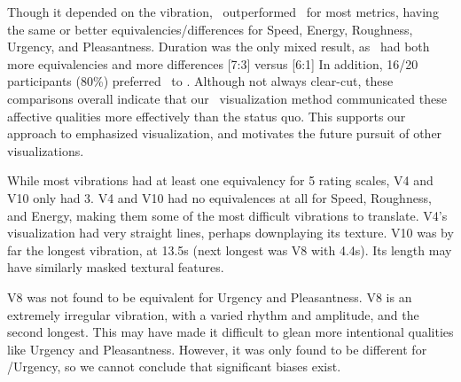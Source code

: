 	Though it depended on the vibration, \linear\ outperformed \original\ for most metrics, having the same or better equivalencies/differences for Speed, Energy, Roughness, Urgency, and Pleasantness.
	Duration was the only mixed result, as \original\ had both more equivalencies and more differences  [7:3] versus [6:1]
    In addition, 16/20 participants (80\%) preferred \linear\ to \original.
    Although not always clear-cut, these comparisons overall indicate that our \linear\ visualization method communicated these %
    affective qualities more effectively than the status quo.
    This supports our approach to emphasized visualization, and motivates the future pursuit of other visualizations.
    
    While most vibrations had at least one equivalency for 5 rating scales, V4 and V10 only had 3.
    V4 and V10 had no equivalences at all for Speed, Roughness, and Energy, making them some of the most difficult vibrations to translate.
    V4's visualization had very straight lines, perhaps downplaying its texture.
    V10 was by far the longest vibration, at 13.5s (next longest was V8 with 4.4s).
    Its length may have similarly masked textural features.
    
    V8 was not found to be equivalent for Urgency and Pleasantness.
    V8 is an extremely irregular vibration, with a varied rhythm and amplitude, and the second longest.
    This may have made it difficult to glean more intentional qualities like Urgency and Pleasantness.
    However, it was only found to be different for \original/Urgency, so we cannot conclude that significant biases exist.
    
